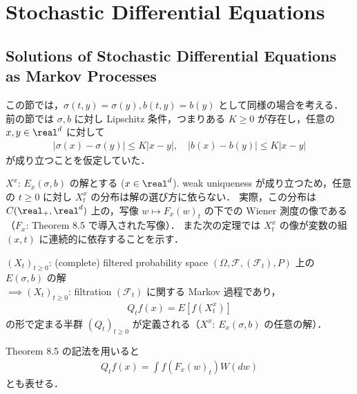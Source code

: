 \documentclass{jsarticle}
\title{}
\author{}
\date{
}
\begin{document}
\setcounter{section}{7}
\section{Stochastic Differential Equations}
\setcounter{subsection}{2}
\subsection{Solutions of Stochastic Differential Equations as Markov Processes}

この節では，$\sigma(t, y)=\sigma(y), b(t, y)=b(y)$ として同様の場合を考える．
前の節では $\sigma, b$ に対し Lipschitz 条件，つまりある $K\ge0$ が存在し，任意の $x, y\in\real^d$ に対して
\begin{align}
    \lvert \sigma(x)-\sigma(y)\rvert \le K\lvert x-y\rvert,\quad
    \lvert b(x)-b(y)\rvert \le K\lvert x-y\rvert
\end{align}
が成り立つことを仮定していた．

$X^x$: $E_x(\sigma, b)$ の解とする ($x\in\real^d$).
weak uniqueness が成り立つため，任意の $t\ge0$ に対し $X_t^x$ の分布は解の選び方に依らない\nazo．
実際，この分布は $C(\real_+, \real^d)$ 上の，写像 $w\mapsto F_x(w)_t$ の下での Wiener 測度の像である（$F_x$: Theorem 8.5 で導入された写像）．
また次の定理では $X_t^x$ の像が変数の組 $(x, t)$ に連続的に依存することを示す．

\setcounter{thm}{5}
\begin{screen}
    \begin{thm}
        $(X_t)_{t\ge0}$: (complete) filtered probability space $(\Omega, \mathcal{F}, (\mathcal{F}_t), P)$ 上の $E(\sigma, b)$ の解 \\
        $\implies (X_t)_{t\ge0}$: filtration $(\mathcal{F}_t)$ に関する Markov 過程であり，
        \begin{align}
            Q_{t}f(x)
            = E[f(X_t^x)]
        \end{align}
        の形で定まる半群 $(Q_t)_{t\ge0}$ が定義される（$X^x$: $E_x(\sigma, b)$ の任意の解）．
    \end{thm}
\end{screen}

\begin{remark*}
    Theorem 8.5 の記法を用いると
    \begin{align}
        Q_{t}f(x)
        = \int f(F_x(w)_t)W(dw)
        \label{eq:802}
    \end{align}
    とも表せる．
\end{remark*}
\end{document}
